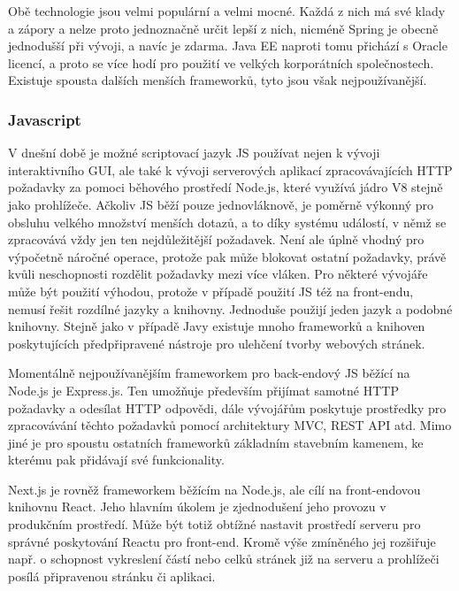 		Obě technologie jsou velmi populární a velmi mocné.
		Každá z nich má své klady a zápory a nelze proto jednoznačně určit lepší z nich, nicméně Spring je obecně jednodušší při
		vývoji, a navíc je zdarma.
		Java EE naproti tomu přichází s Oracle licencí, a proto se více hodí pro použití ve velkých korporátních
		společnostech. \cite{java_ee_vs_spring}
		Existuje spousta dalších menších frameworků, tyto jsou však nejpoužívanější.

		\subsubsection{Javascript}

		V dnešní době je možné scriptovací jazyk \ac{JS} používat nejen k vývoji interaktivního \Ac{GUI},
		ale také k vývoji serverových aplikací zpracovávajících \Ac{HTTP} požadavky za pomoci běhového prostředí Node.js,
		které využívá jádro V8 stejně jako prohlížeče. \cite{express_node_introduction}
		Ačkoliv \ac{JS} běží pouze jednovláknově, je poměrně výkonný pro obsluhu velkého množství menších dotazů, a to díky
		systému událostí, v němž se zpracovává vždy jen ten nejdůležitější požadavek.
		Není ale úplně vhodný pro výpočetně náročné operace, protože pak může blokovat ostatní požadavky, právě kvůli
		neschopnosti rozdělit požadavky mezi více vláken. \cite{js_eventloop}
		Pro některé vývojáře může být použití výhodou, protože v případě použití \ac{JS} též na front-endu,
		nemusí řešit rozdílné jazyky a knihovny.
		Jednoduše použijí jeden jazyk a podobné knihovny.
		Stejně jako v případě Javy existuje mnoho frameworků a knihoven poskytujících předpřipravené nástroje pro ulehčení
		tvorby webových stránek.

		Momentálně nejpoužívanějším frameworkem pro back-endový \ac{JS} běžící na Node.js je Express.js. \cite{state_of_js_2020}
		Ten umožňuje především přijímat samotné \Ac{HTTP} požadavky a odesílat \Ac{HTTP} odpovědi, dále vývojářům poskytuje
		prostředky pro zpracovávání těchto požadavků pomocí architektury \Ac{MVC}, \Ac{REST} \ac{API} atd.
		Mimo jiné je pro spoustu ostatních frameworků základním stavebním kamenem, ke kterému pak přidávají
		své funkcionality. \cite{express_node_introduction}

		Next.js je rovněž frameworkem běžícím na Node.js, ale cílí na front-endovou knihovnu React.
		Jeho hlavním úkolem je zjednodušení jeho provozu v produkčním prostředí.
		Může být totiž obtížné nastavit prostředí serveru pro správné poskytování Reactu pro front-end.
		Kromě výše zmíněného jej rozšiřuje např. o schopnost vykreslení částí nebo celků stránek již na serveru a
		prohlížeči posílá připravenou stránku či aplikaci. \cite{create_nextjs_app}


